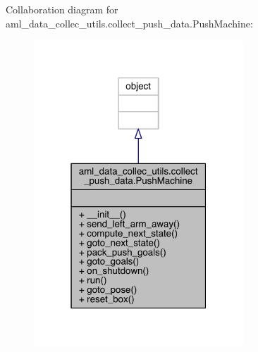 Collaboration diagram for aml\+\_\+data\+\_\+collec\+\_\+utils.\+collect\+\_\+push\+\_\+data.\+Push\+Machine\+:\nopagebreak
\begin{figure}[H]
\begin{center}
\leavevmode
\includegraphics[width=223pt]{classaml__data__collec__utils_1_1collect__push__data_1_1_push_machine__coll__graph}
\end{center}
\end{figure}
